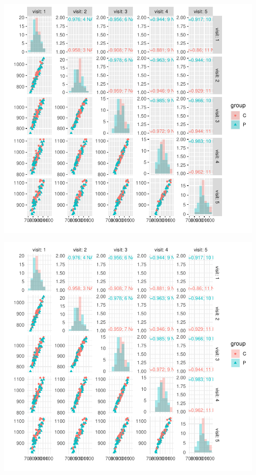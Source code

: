 \documentclass[12pt]{article}
\begin{document}
\bigskip

\begin{minipage}{0.48\linewidth}
\begin{center}
\includegraphics[trim={0 0 0 0},width=\textwidth]{./figures/scatterplot-group.pdf}
\end{center}
\end{minipage}
\begin{minipage}{0.48\linewidth}
\begin{center}
\includegraphics[trim={0 0 0 0},width=\textwidth]{./figures/scatterplotMin-group.pdf}
\end{center}
\end{minipage}
\end{document}
